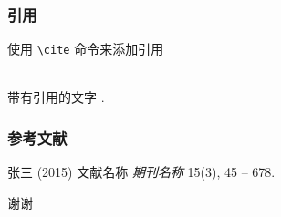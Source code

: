 \documentclass{beamer}
\begin{document}

\begin{frame}[fragile] %
\frametitle{引用}
使用 \verb|\cite| 命令来添加引用\\~

带有引用的文字 \cite{p1}.
\end{frame}


\begin{frame}
\frametitle{参考文献}
\footnotesize{
\begin{thebibliography}{99} %
 张三 (2015)
\newblock 文献名称
\newblock \emph{期刊名称} 15(3), 45 -- 678.
\end{thebibliography}
}
\end{frame}


\begin{frame}
\Huge{\centerline{谢谢}}
\end{frame}

\end{document}
